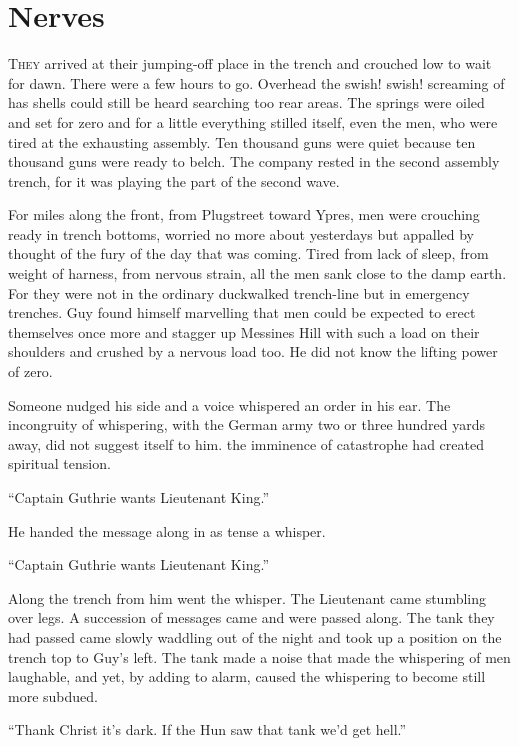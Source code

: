 \chapter*{\textsf{Nerves}}

T\textsc{hey} arrived at their jumping-off place in the trench and crouched low to wait for dawn. There were a few hours to go. Overhead the swish! swish! screaming of has shells could still be heard searching too rear areas. The springs were oiled and set for zero and for a little everything stilled itself, even the men, who were tired at the exhausting assembly. Ten thousand guns were quiet because ten thousand guns were ready to belch. The company rested in the second assembly trench, for it was playing the part of the second wave.

For miles along the front, from Plugstreet toward Ypres, men were crouching ready in trench bottoms, worried no more about yesterdays but appalled by thought of the fury of the day that was coming. Tired from lack of sleep, from weight of harness, from nervous strain, all the men sank close to the damp earth. For they were not in the ordinary duckwalked trench-line but in emergency trenches. Guy found himself marvelling that men could be expected to erect themselves once more and stagger up Messines Hill with such a load on their shoulders and crushed by a nervous load too. He did not know the lifting power of zero.

Someone nudged his side and a voice whispered an order in his ear. The incongruity of whispering, with the German army two or three hundred yards away, did not suggest itself to him. the imminence of catastrophe had created spiritual tension.

``Captain Guthrie wants Lieutenant King.''

He handed the message along in as tense a whisper.

``Captain Guthrie wants Lieutenant King.''

Along the trench from him went the whisper. The Lieutenant came stumbling over legs. A succession of messages came and were passed along. The tank they had passed came slowly waddling out of the night and took up a position on the trench top to Guy's left. The tank made a noise that made the whispering of men laughable, and yet, by adding to alarm, caused the whispering to become still more subdued.

``Thank Christ it's dark. If the Hun saw that tank we'd get hell.''

